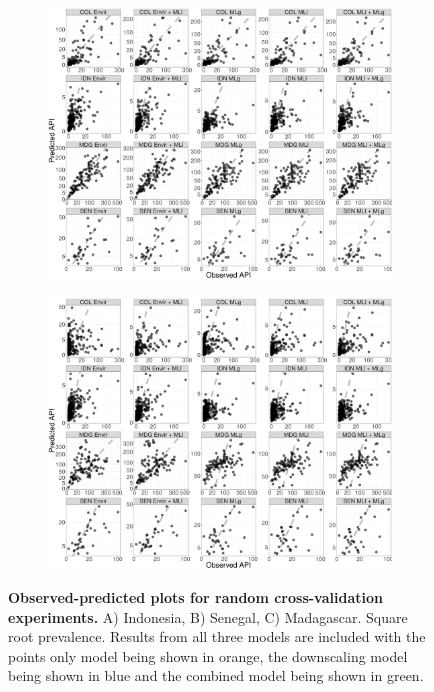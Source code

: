 \documentclass[11pt]{article}
\begin{document}
\begin{figure}
\centering
    \begin{subfigure}[b]{0.49\textwidth}
        \includegraphics[width=\textwidth]{figs/cv1_scatter.png}
        \caption{}
        \label{fig:gull}
    \end{subfigure}
    \begin{subfigure}[b]{0.49\textwidth}
        \includegraphics[width=\textwidth]{figs/cv2_scatter.png}
        \caption{}
        \label{fig:gull}
    \end{subfigure}
\caption{{\bf Observed-predicted plots for random cross-validation experiments.}
A) Indonesia, B) Senegal, C) Madagascar. Square root prevalence.
Results from all three models are included with the points only model being shown in orange, the downscaling model being shown in blue and the combined model being shown in green.
}
\label{randompredobspointfacet}
\end{figure}
\end{document}
